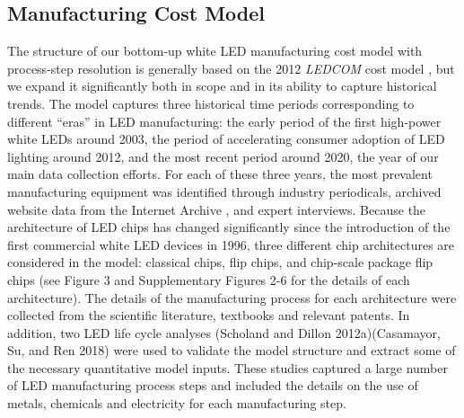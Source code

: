 \documentclass[parskip=full]{article}
\begin{document}
\subsection{Manufacturing Cost Model}

The structure of our bottom-up white LED manufacturing cost model with process-step resolution is generally based on the 2012 \textit{LEDCOM} cost model \cite{ledcomv2}, but we expand it significantly both in scope and in its ability to capture historical trends. The model captures three historical time periods corresponding to different “eras” in LED manufacturing: the early period of the first high-power white LEDs around 2003, the period of accelerating consumer adoption of LED lighting around 2012, and the most recent period around 2020, the year of our main data collection efforts. For each of these three years, the most prevalent manufacturing equipment was identified through industry periodicals, archived website data from the Internet Archive , and expert interviews. Because the architecture of LED chips has changed significantly since the introduction of the first commercial white LED devices in 1996, three different chip architectures are considered in the model: classical chips, flip chips, and chip-scale package flip chips (see Figure 3 and Supplementary Figures 2-6 for the details of each architecture). The details of the manufacturing process for each architecture were collected from the scientific literature, textbooks  and relevant patents. In addition, two LED life cycle analyses (Scholand and Dillon 2012a)(Casamayor, Su, and Ren 2018) were used to validate the model structure and extract some of the necessary quantitative model inputs. These studies captured a large number of LED manufacturing process steps and included the details on the use of metals, chemicals and electricity for each manufacturing step.
\end{document}
